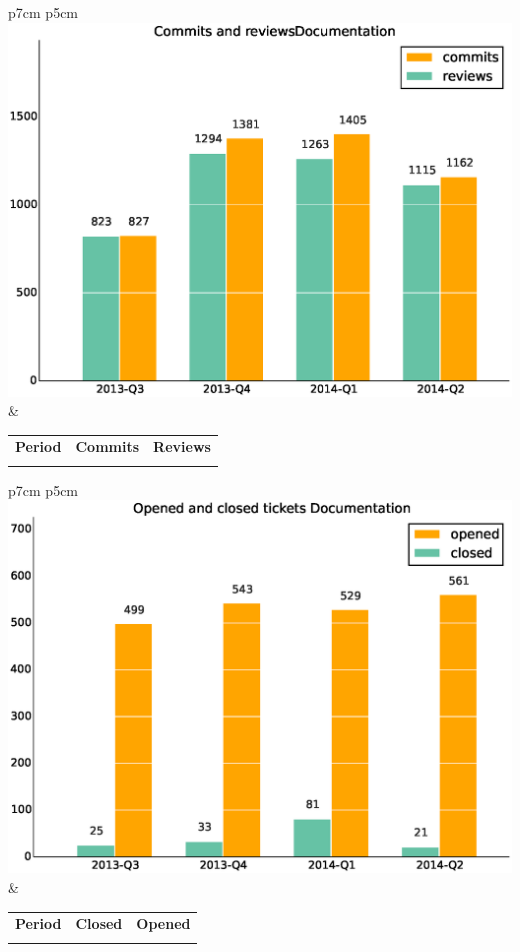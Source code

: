 \documentclass[a4wide,11pt]{report}
\begin{document}
\begin{tabular}{p{7cm} p{5cm}}
    \vspace{0pt} 
    \includegraphics[scale=.35]{figs/commitsDocumentation.eps}
    & 
    \vspace{0pt}
    \begin{tabular}{l|r|r|}%
    \bfseries Period & \bfseries Commits & \bfseries Reviews %
    \csvreader[head to column names]{data/commitsDocumentation.csv}{}%
    {\\ & \commits & \submitted}
    \end{tabular}
\end{tabular}

\begin{tabular}{p{7cm} p{5cm}}
    \vspace{0pt} 
    \includegraphics[scale=.35]{figs/closedDocumentation.eps}
    & 
    \vspace{0pt}
    \begin{tabular}{l|r|r|}%
\bfseries Period & \bfseries Closed & \bfseries Opened
    \csvreader[head to column names]{data/closedDocumentation.csv}{}%
    {\\ & \closed & \opened}
    \end{tabular}
\end{tabular}
\end{document}
